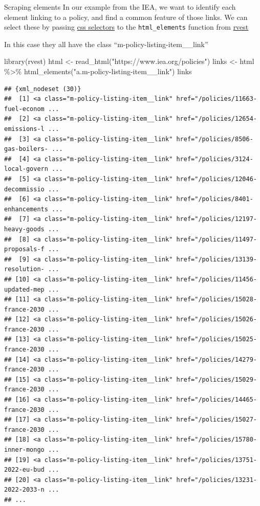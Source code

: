 \documentclass[
  10pt,
  ignorenonframetext,
  aspectratio=169]{beamer}
\newenvironment{Shaded}{\begin{snugshade}}{\end{snugshade}}
\newcommand{\FunctionTok}[1]{\textcolor[rgb]{0.94,0.94,0.56}{#1}}
\newcommand{\NormalTok}[1]{\textcolor[rgb]{0.80,0.80,0.80}{#1}}
\newcommand{\OtherTok}[1]{\textcolor[rgb]{0.94,0.94,0.56}{#1}}
\newcommand{\SpecialCharTok}[1]{\textcolor[rgb]{0.86,0.64,0.64}{#1}}
\newcommand{\StringTok}[1]{\textcolor[rgb]{0.80,0.58,0.58}{#1}}
\begin{document}
\begin{frame}[fragile]{Scraping elements}
\protect\hypertarget{scraping-elements}{}
In our example from the IEA, we want to identify each element linking to
a policy, and find a common feature of those links. We can select these
by passing
\href{https://developer.mozilla.org/en-US/docs/Learn/CSS/Building_blocks/Selectors}{css
selectors} to the \texttt{html\_elements} function from
\href{https://rvest.tidyverse.org/}{rvest}

In this case they all have the class ``m-policy-listing-item\_\_link''

\scriptsize

\begin{Shaded}
\begin{Highlighting}[]
\FunctionTok{library}\NormalTok{(rvest)}
\NormalTok{html }\OtherTok{\textless{}{-}} \FunctionTok{read\_html}\NormalTok{(}\StringTok{"https://www.iea.org/policies"}\NormalTok{)}
\NormalTok{links }\OtherTok{\textless{}{-}}\NormalTok{ html }\SpecialCharTok{\%\textgreater{}\%} \FunctionTok{html\_elements}\NormalTok{(}\StringTok{"a.m{-}policy{-}listing{-}item\_\_link"}\NormalTok{)}
\NormalTok{links}
\end{Highlighting}
\end{Shaded}

\begin{verbatim}
## {xml_nodeset (30)}
##  [1] <a class="m-policy-listing-item__link" href="/policies/11663-fuel-econom ...
##  [2] <a class="m-policy-listing-item__link" href="/policies/12654-emissions-l ...
##  [3] <a class="m-policy-listing-item__link" href="/policies/8506-gas-boilers- ...
##  [4] <a class="m-policy-listing-item__link" href="/policies/3124-local-govern ...
##  [5] <a class="m-policy-listing-item__link" href="/policies/12046-decommissio ...
##  [6] <a class="m-policy-listing-item__link" href="/policies/8401-enhancements ...
##  [7] <a class="m-policy-listing-item__link" href="/policies/12197-heavy-goods ...
##  [8] <a class="m-policy-listing-item__link" href="/policies/11497-proposals-f ...
##  [9] <a class="m-policy-listing-item__link" href="/policies/13139-resolution- ...
## [10] <a class="m-policy-listing-item__link" href="/policies/11456-updated-mep ...
## [11] <a class="m-policy-listing-item__link" href="/policies/15028-france-2030 ...
## [12] <a class="m-policy-listing-item__link" href="/policies/15026-france-2030 ...
## [13] <a class="m-policy-listing-item__link" href="/policies/15025-france-2030 ...
## [14] <a class="m-policy-listing-item__link" href="/policies/14279-france-2030 ...
## [15] <a class="m-policy-listing-item__link" href="/policies/15029-france-2030 ...
## [16] <a class="m-policy-listing-item__link" href="/policies/14465-france-2030 ...
## [17] <a class="m-policy-listing-item__link" href="/policies/15027-france-2030 ...
## [18] <a class="m-policy-listing-item__link" href="/policies/15780-inner-mongo ...
## [19] <a class="m-policy-listing-item__link" href="/policies/13751-2022-eu-bud ...
## [20] <a class="m-policy-listing-item__link" href="/policies/13231-2022-2033-n ...
## ...
\end{verbatim}
\end{frame}
\end{document}

